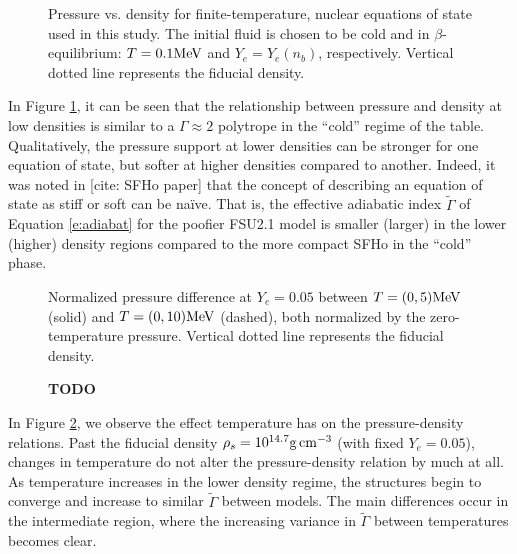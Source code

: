 \begin{figure}
	\centering
	
	\caption[Pressure vs. density for a cold, beta-equilibrium slice]{
		Pressure vs. density for finite-temperature, nuclear equations of state used in this study. The initial fluid is chosen to be cold and in $\beta$-equilibrium: $T=0.1 {\rm MeV}$ and $Y_e = Y_e (n_b)$, respectively.  Vertical dotted line represents the fiducial density.
	}
	\label{fig:PvsRho}
\end{figure}

In Figure \ref{fig:PvsRho}, it can be seen that the relationship between pressure and density at low densities is similar to a $\Gamma \approx 2$ polytrope in the ``cold'' regime of the table.  Qualitatively, the pressure support at lower densities can be stronger for one equation of state, but softer at higher densities compared to another.  Indeed, it was noted in [cite: SFHo paper] that the concept of describing an equation of state as stiff or soft can be na\"{i}ve.  That is, the effective adiabatic index $\tilde{\Gamma}$ of Equation \ref{e:adiabat} for the poofier FSU2.1 model is smaller (larger) in the lower (higher) density regions compared to the more compact SFHo in the ``cold'' phase.

\begin{figure}
	\centering
	
	\caption[Difference in pressure vs. density for constant $Y_e$, varying temperature]{
		Normalized pressure difference at $Y_e = 0.05$ between $T = (0,5) {\rm MeV}$ (solid) and $T = (0,10) {\rm MeV}$ (dashed), both normalized by the zero-temperature pressure. Vertical dotted line represents the fiducial density.
	}
	\label{fig:dPvsRho}
\end{figure}


\begin{figure}
	\centering
	
	\caption[Adiabatic index vs. density for constant $Y_e$, varying temperature]
	{
		\textbf{TODO}
	}
	\label{fig:GammavsRho}
\end{figure}


In Figure \ref{fig:dPvsRho}, we observe the effect temperature has on the pressure-density relations.  Past the fiducial density $\rho_s = 10^{14.7} {\rm g \, cm^{-3}}$ (with fixed $Y_e = 0.05$), changes in temperature do not alter the pressure-density relation by much at all.  As temperature increases in the lower density regime, the structures begin to converge and increase to similar $\tilde{\Gamma}$ between models.  The main differences occur in the intermediate region, where the increasing variance in $\tilde{\Gamma}$ between temperatures becomes clear.

